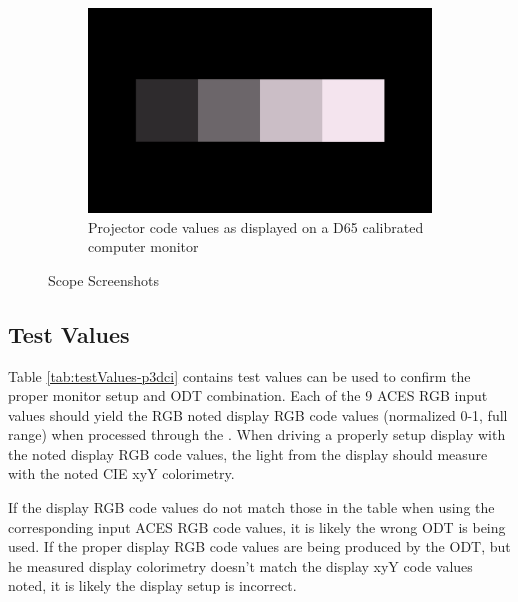 \begin{figure}[ht!]
\begin{subfigure}[b]{0.475\textwidth}
            \includegraphics[width=\textwidth]{images/p3dci/p3dci_image}
            \caption[Projector code values as displayed on a D65 calibrated computer monitor]%
            {{\small Projector code values as displayed on a D65 calibrated computer monitor}}    
            \label{fig:cv-p3dci}
        \end{subfigure}
        \caption[]
        {\small \texttt{} Scope Screenshots} 
        \label{fig:screenshots-p3dci}
    \end{figure}

\subsection{Test Values}
\label{subsec:testValues-p3dci}

Table \ref{tab:testValues-p3dci} contains test values can be used to confirm the proper monitor setup and ODT combination.  Each of the 9 ACES RGB input values should yield the RGB noted display RGB code values (normalized 0-1, full range) when processed through the \texttt{}. When driving a properly setup display with the noted display RGB code values, the light from the display should measure with the noted CIE xyY colorimetry.  

If the display RGB code values do not match those in the table when using the corresponding input ACES RGB code values, it is likely the wrong ODT is being used.  If the proper display RGB code values are being produced by the ODT, but he measured display colorimetry doesn't match the display xyY code values noted, it is likely the display setup is incorrect.

